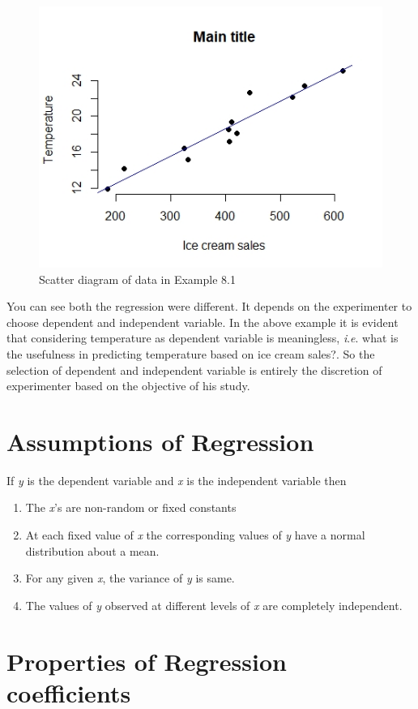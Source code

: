 \documentclass[
]{book}
\begin{document}
\begin{figure}

{\centering \includegraphics[width=0.5\linewidth]{images/r8} 

}

\caption{Scatter diagram of data in Example 8.1}\label{fig:r7}
\end{figure}

You can see both the regression were different. It depends on the
experimenter to choose dependent and independent variable. In the above
example it is evident that considering temperature as dependent variable
is meaningless, \emph{i}.\emph{e}. what is the usefulness in predicting
temperature based on ice cream sales?. So the selection of dependent and
independent variable is entirely the discretion of experimenter based on
the objective of his study.

\hypertarget{assumptions-of-regression}{%
\section{Assumptions of Regression}\label{assumptions-of-regression}}

If \emph{y} is the dependent variable and \emph{x} is the independent variable
then

\begin{enumerate}
\def\labelenumi{\arabic{enumi}.}
\item
  The \emph{x}'s are non-random or fixed constants
\item
  At each fixed value of \emph{x} the corresponding values of \emph{y} have a
  normal distribution about a mean.
\item
  For any given \emph{x}, the variance of \emph{y} is same.
\item
  The values of \emph{y} observed at different levels of \emph{x} are completely
  independent.
\end{enumerate}

\hypertarget{properties-of-regression-coefficients}{%
\section{Properties of Regression coefficients}\label{properties-of-regression-coefficients}}
\end{document}
